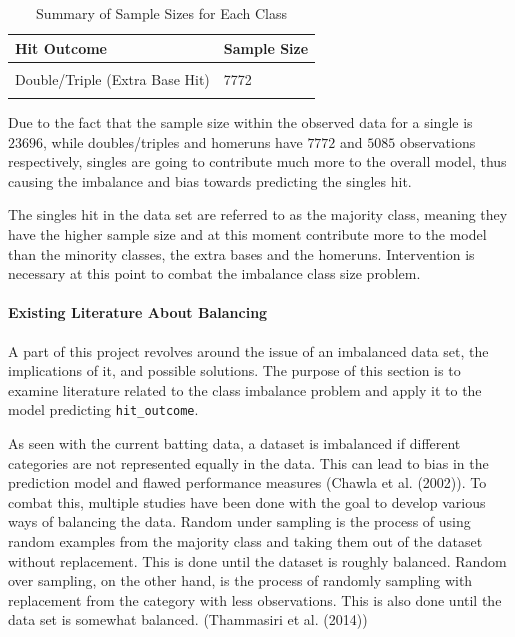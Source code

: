 \documentclass[
  letterpaper,
  DIV=11,
  numbers=noendperiod]{scrartcl}
\let\oldparagraph\paragraph
\renewcommand{\paragraph}[1]{\oldparagraph{#1}\mbox{}}
\begin{document}
\begin{table}[!h]
\centering
\caption{\label{tab:unnamed-chunk-40}Summary of Sample Sizes for Each Class}
\centering
\begin{tabular}[t]{ll}
\toprule
Hit Outcome & Sample Size\\
\midrule
\cellcolor{gray!10}{Single} & \cellcolor{gray!10}{23696}\\
Double/Triple (Extra Base Hit) & 7772\\
\cellcolor{gray!10}{Homerun} & \cellcolor{gray!10}{5085}\\
\bottomrule
\end{tabular}
\end{table}

Due to the fact that the sample size within the observed data for a
single is \(23696\), while doubles/triples and homeruns have \(7772\)
and \(5085\) observations respectively, singles are going to contribute
much more to the overall model, thus causing the imbalance and bias
towards predicting the singles hit.

The singles hit in the data set are referred to as the majority class,
meaning they have the higher sample size and at this moment contribute
more to the model than the minority classes, the extra bases and the
homeruns. Intervention is necessary at this point to combat the
imbalance class size problem.

\paragraph{Existing Literature About
Balancing}\label{existing-literature-about-balancing}

A part of this project revolves around the issue of an imbalanced data
set, the implications of it, and possible solutions. The purpose of this
section is to examine literature related to the class imbalance problem
and apply it to the model predicting \texttt{hit\_outcome}.

As seen with the current batting data, a dataset is imbalanced if
different categories are not represented equally in the data. This can
lead to bias in the prediction model and flawed performance measures
(Chawla et al. (2002)). To combat this, multiple studies have been done
with the goal to develop various ways of balancing the data. Random
under sampling is the process of using random examples from the majority
class and taking them out of the dataset without replacement. This is
done until the dataset is roughly balanced. Random over sampling, on the
other hand, is the process of randomly sampling with replacement from
the category with less observations. This is also done until the data
set is somewhat balanced. (Thammasiri et al. (2014))
\end{document}
